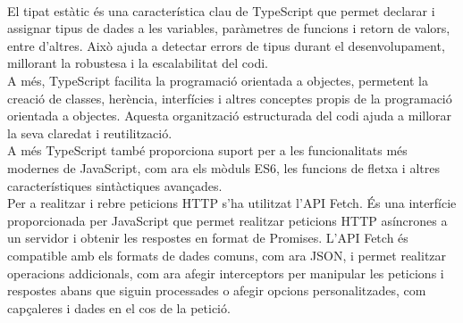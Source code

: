 \\[3mm]
El tipat estàtic és una característica clau de TypeScript que permet declarar i assignar tipus de dades a les variables, paràmetres de funcions i retorn de valors, entre d'altres. Això ajuda a detectar errors de tipus durant el desenvolupament, millorant la robustesa i la escalabilitat del codi.
\\[3mm]
A més, TypeScript facilita la programació orientada a objectes, permetent la creació de classes, herència, interfícies i altres conceptes propis de la programació orientada a objectes. Aquesta organització estructurada del codi ajuda a millorar la seva claredat i reutilització.
\\[3mm]
A més TypeScript també proporciona suport per a les funcionalitats més modernes de JavaScript, com ara els mòduls ES6, les funcions de fletxa i altres característiques sintàctiques avançades.
\\[3mm]
Per a realitzar i rebre peticions HTTP s'ha utilitzat l'API Fetch. És una interfície proporcionada per JavaScript que permet realitzar peticions HTTP asíncrones a un servidor i obtenir les respostes en format de Promises. L'API Fetch és compatible amb els formats de dades comuns, com ara JSON, i permet realitzar operacions addicionals, com ara afegir interceptors per manipular les peticions i respostes abans que siguin processades o afegir opcions personalitzades, com capçaleres i dades en el cos de la petició.
